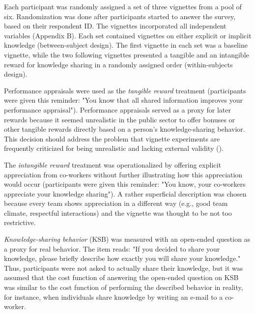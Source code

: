 \documentclass[twocolumn, issue, empirical, authordate]{jote-new-article}
\begin{document}
Each participant was randomly assigned a set of three vignettes from a pool of six. Randomization was done after participants started to answer the survey, based on their respondent ID. The vignettes incorporated all independent variables (Appendix B). Each set contained vignettes on either explicit or implicit knowledge (between-subject design). The first vignette in each set was a baseline vignette, while the two following vignettes presented a tangible and an intangible reward for knowledge sharing in a randomly assigned order (within-subjects design).

Performance appraisals were used as the \emph{tangible reward} treatment (participants were given this reminder: "You know that all shared information improves your performance appraisal"). Performance appraisals served as a proxy for later rewards because it seemed unrealistic in the public sector to offer bonuses or other tangible rewards directly based on a person's knowledge-sharing behavior. This decision should address the problem that vignette experiments are frequently criticized for being unrealistic and lacking external validity ().

The \emph{intangible reward} treatment was operationalized by offering explicit appreciation from co-workers without further illustrating how this appreciation would occur (participants were given this reminder: "You know, your co-workers appreciate your knowledge sharing"). A rather superficial description was chosen because every team shows appreciation in a different way (e.g., good team climate, respectful interactions) and the vignette was thought to be not too restrictive.

\emph{Knowledge-sharing behavior} (KSB) was measured with an open-ended question as a proxy for real behavior. The item reads: "If you decided to share your knowledge, please briefly describe how exactly you will share your knowledge." Thus, participants were not asked to actually share their knowledge, but it was assumed that the cost function of answering the open-ended question on KSB was similar to the cost function of performing the described behavior in reality, for instance, when individuals share knowledge by writing an e-mail to a co-worker.
\end{document}
